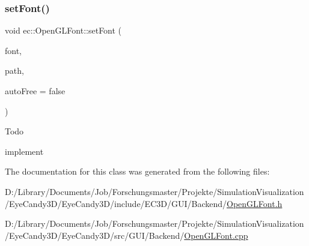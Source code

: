 \subsubsection{\texorpdfstring{set\+Font()}{setFont()}}
{\footnotesize\ttfamily void ec\+::\+Open\+G\+L\+Font\+::set\+Font (\begin{DoxyParamCaption}\item[{\mbox{\hyperlink{classec_1_1_font_texture_atlas}{ec\+::\+Font\+Texture\+Atlas}} $\ast$}]{font,  }\item[{const std\+::string \&}]{path,  }\item[{bool}]{auto\+Free = {\ttfamily false} }\end{DoxyParamCaption})\hspace{0.3cm}{\ttfamily [virtual]}}

\begin{DoxyRefDesc}{Todo}
\item[\mbox{\hyperlink{todo__todo000004}{Todo}}]implement \end{DoxyRefDesc}


The documentation for this class was generated from the following files\+:\begin{DoxyCompactItemize}
\item 
D\+:/\+Library/\+Documents/\+Job/\+Forschungsmaster/\+Projekte/\+Simulation\+Visualization/\+Eye\+Candy3\+D/\+Eye\+Candy3\+D/include/\+E\+C3\+D/\+G\+U\+I/\+Backend/\mbox{\hyperlink{_open_g_l_font_8h}{Open\+G\+L\+Font.\+h}}\item 
D\+:/\+Library/\+Documents/\+Job/\+Forschungsmaster/\+Projekte/\+Simulation\+Visualization/\+Eye\+Candy3\+D/\+Eye\+Candy3\+D/src/\+G\+U\+I/\+Backend/\mbox{\hyperlink{_open_g_l_font_8cpp}{Open\+G\+L\+Font.\+cpp}}\end{DoxyCompactItemize}
